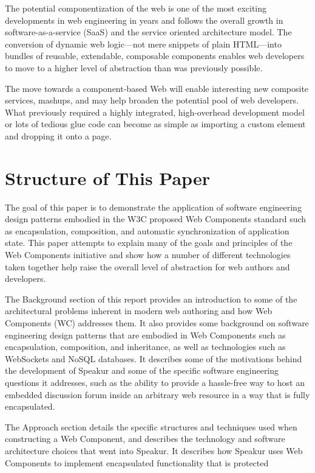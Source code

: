 The potential componentization of the web is one of the most exciting developments in web engineering in years and follows the overall growth in software-as-a-service (SaaS) 
and the service oriented architecture
model. 
The conversion of dynamic web logic---not mere snippets of plain HTML---into bundles of reusable, extendable, composable components enables web developers to move to a higher level of abstraction than was previously possible.

The move towards a component-based Web will enable interesting new composite services, mashups, and may help broaden the potential pool of web developers. 
What previously required a highly integrated, high-overhead development model or lots of tedious glue code can become as simple as importing a custom element and dropping it onto a page.


\section{Structure of This Paper}
%

The goal of this paper is to demonstrate the application of software engineering design patterns embodied in the  W3C proposed Web Components standard such as encapsulation, composition, and
automatic synchronization of application state. 
This paper attempts to explain many of the goals and principles of the Web Components initiative and show how a number of different technologies taken together help raise the overall level of abstraction for web authors and developers.

The Background section of this report provides an introduction to some of the architectural problems inherent in modern web authoring and how Web Components (WC) addresses them. 
It also provides some background on software engineering design patterns that are embodied in Web Components such as encapsulation, composition, and inheritance, as well as technologies such as WebSockets and NoSQL databases.
It describes some of the motivations behind the development of Speakur and some of the specific software engineering questions it addresses, such as the ability to provide a hassle-free way to host an embedded discussion forum inside an arbitrary web resource in a way that is fully encapsulated.

The Approach section details the specific structures and techniques used when constructing a Web Component, and describes the technology and software architecture choices that went into Speakur. 
It describes how Speakur uses Web Components to implement encapsulated functionality that is protected 

